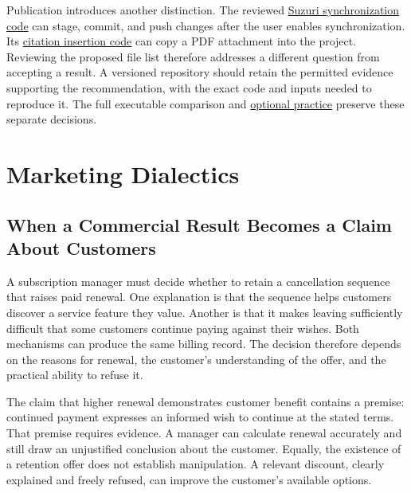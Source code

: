 Publication introduces another distinction. The reviewed
\href{https://github.com/harrywang/suzuri/blob/88f58aae544bdc60d5068e7b5d40a05ca7f1a564/crates/suzuri_sync/src/suzuri_sync.rs}{Suzuri
synchronization code} can stage, commit, and push changes after the user
enables synchronization. Its
\href{https://github.com/harrywang/suzuri/blob/88f58aae544bdc60d5068e7b5d40a05ca7f1a564/crates/citations/src/insert_citation.rs}{citation
insertion code} can copy a PDF attachment into the project. Reviewing
the proposed file list therefore addresses a different question from
accepting a result. A versioned repository should retain the permitted
evidence supporting the recommendation, with the exact code and inputs
needed to reproduce it. The full executable comparison and
\href{../07_Labs/Reproducible_Recommendations/README.md}{optional
practice} preserve these separate decisions.

\hypertarget{M09-marketing-dialectics}{%
\chapter{Marketing Dialectics}\label{M09-marketing-dialectics}}

\noindent {}

\hypertarget{M09-when-a-commercial-result-becomes-a-claim-about-customers}{%
\section{When a Commercial Result Becomes a Claim About
Customers}\label{M09-when-a-commercial-result-becomes-a-claim-about-customers}}

\noindent \noindent A subscription manager must decide whether to retain a
cancellation sequence that raises paid renewal. One explanation is that
the sequence helps customers discover a service feature they value.
Another is that it makes leaving sufficiently difficult that some
customers continue paying against their wishes. Both mechanisms can
produce the same billing record. The decision therefore depends on the
reasons for renewal, the customer's understanding of the offer, and the
practical ability to refuse it.

The claim that higher renewal demonstrates customer benefit contains a
premise: continued payment expresses an informed wish to continue at the
stated terms. That premise requires evidence. A manager can calculate
renewal accurately and still draw an unjustified conclusion about the
customer. Equally, the existence of a retention offer does not establish
manipulation. A relevant discount, clearly explained and freely refused,
can improve the customer's available options.


